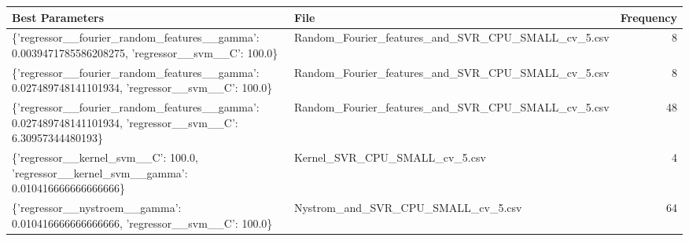 \begin{tabularx}{\textwidth}{llr}
\toprule
                                                                                           Best Parameters &                                               File &  Frequency \\
\midrule
          \{'regressor\_\_fourier\_random\_features\_\_gamma': 0.0039471785586208275, 'regressor\_\_svm\_\_C': 100.0\} & Random\_Fourier\_features\_and\_SVR\_CPU\_SMALL\_cv\_5.csv &          8 \\
           \{'regressor\_\_fourier\_random\_features\_\_gamma': 0.027489748141101934, 'regressor\_\_svm\_\_C': 100.0\} & Random\_Fourier\_features\_and\_SVR\_CPU\_SMALL\_cv\_5.csv &          8 \\
\{'regressor\_\_fourier\_random\_features\_\_gamma': 0.027489748141101934, 'regressor\_\_svm\_\_C': 6.30957344480193\} & Random\_Fourier\_features\_and\_SVR\_CPU\_SMALL\_cv\_5.csv &         48 \\
                 \{'regressor\_\_kernel\_svm\_\_C': 100.0, 'regressor\_\_kernel\_svm\_\_gamma': 0.010416666666666666\} &                      Kernel\_SVR\_CPU\_SMALL\_cv\_5.csv &          4 \\
                          \{'regressor\_\_nystroem\_\_gamma': 0.010416666666666666, 'regressor\_\_svm\_\_C': 100.0\} &                 Nystrom\_and\_SVR\_CPU\_SMALL\_cv\_5.csv &         64 \\
\bottomrule
\end{tabularx}
